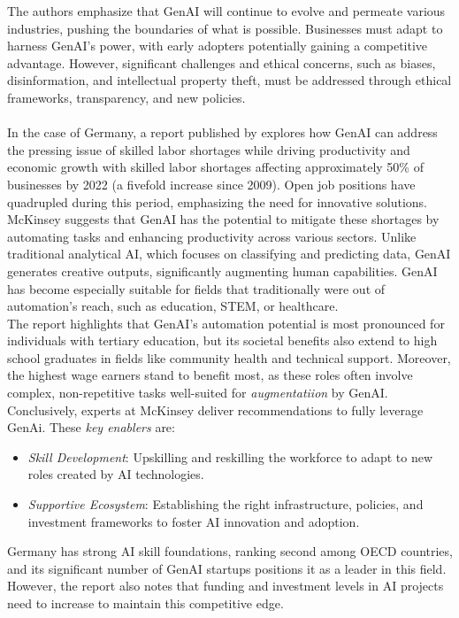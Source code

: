 The authors emphasize that GenAI will continue to evolve and permeate various industries, pushing the boundaries of what is possible. Businesses must adapt to harness GenAI's power, with early adopters potentially gaining a competitive advantage. However, significant challenges and ethical concerns, such as biases, disinformation, and intellectual property theft, must be addressed through ethical frameworks, transparency, and new policies. \\\\
In the case of Germany, a report published by \textcite{mckinsey2023genai} explores how GenAI can address the pressing issue of skilled labor shortages while driving productivity and economic growth with skilled labor shortages affecting approximately 50\% of businesses by 2022 (a fivefold increase since 2009). Open job positions have quadrupled during this period, emphasizing the need for innovative solutions.\\
McKinsey suggests that GenAI has the potential to mitigate these shortages by automating tasks and enhancing productivity across various sectors. Unlike traditional analytical AI, which focuses on classifying and predicting data, GenAI generates creative outputs, significantly augmenting human capabilities. GenAI has become especially suitable for fields that traditionally were out of automation's reach, such as education, STEM, or healthcare.\\
The report highlights that GenAI's automation potential is most pronounced for individuals with tertiary education, but its societal benefits also extend to high school graduates in fields like community health and technical support. Moreover, the highest wage earners stand to benefit most, as these roles often involve complex, non-repetitive tasks well-suited for \textit{augmentatiion} by GenAI. \\
Conclusively, experts at McKinsey deliver recommendations to fully leverage GenAi. These \textit{key enablers} are:
\begin{itemize}
    \item \textit{Skill Development}: Upskilling and reskilling the workforce to adapt to new roles created by AI technologies.
    \item \textit{Supportive Ecosystem}: Establishing the right infrastructure, policies, and investment frameworks to foster AI innovation and adoption.
\end{itemize}
Germany has strong AI skill foundations, ranking second among OECD countries, and its significant number of GenAI startups positions it as a leader in this field. However, the report also notes that funding and investment levels in AI projects need to increase to maintain this competitive edge.
